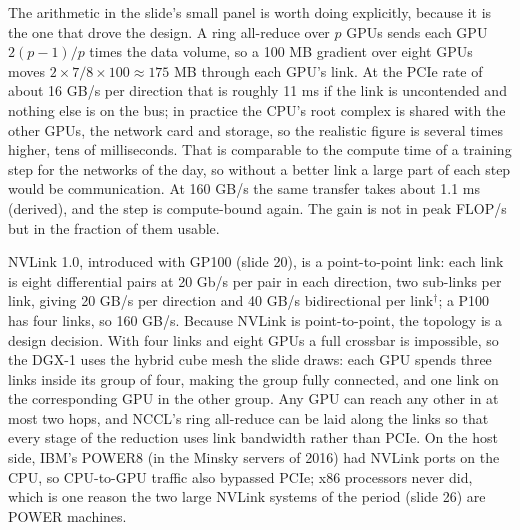 \documentclass[11pt,letterpaper]{article}
\begin{document}
The arithmetic in the slide's small panel is worth doing explicitly, because it is the one that drove the design. A ring all-reduce over $p$ GPUs sends each GPU $2(p-1)/p$ times the data volume, so a 100 MB gradient over eight GPUs moves $2 \times 7/8 \times 100 \approx 175$ MB through each GPU's link. At the PCIe rate of about 16 GB/s per direction that is roughly 11 ms if the link is uncontended and nothing else is on the bus; in practice the CPU's root complex is shared with the other GPUs, the network card and storage, so the realistic figure is several times higher, tens of milliseconds. That is comparable to the compute time of a training step for the networks of the day, so without a better link a large part of each step would be communication. At 160 GB/s the same transfer takes about 1.1 ms (derived), and the step is compute-bound again. The gain is not in peak FLOP/s but in the fraction of them usable.

NVLink 1.0, introduced with GP100 (slide 20), is a point-to-point link: each link is eight differential pairs at 20 Gb/s per pair in each direction, two sub-links per link, giving 20 GB/s per direction and 40 GB/s bidirectional per link$^\dagger$; a P100 has four links, so 160 GB/s. Because NVLink is point-to-point, the topology is a design decision. With four links and eight GPUs a full crossbar is impossible, so the DGX-1 uses the hybrid cube mesh the slide draws: each GPU spends three links inside its group of four, making the group fully connected, and one link on the corresponding GPU in the other group. Any GPU can reach any other in at most two hops, and NCCL's ring all-reduce can be laid along the links so that every stage of the reduction uses link bandwidth rather than PCIe. On the host side, IBM's POWER8 (in the Minsky servers of 2016) had NVLink ports on the CPU, so CPU-to-GPU traffic also bypassed PCIe; x86 processors never did, which is one reason the two large NVLink systems of the period (slide 26) are POWER machines.
\end{document}
